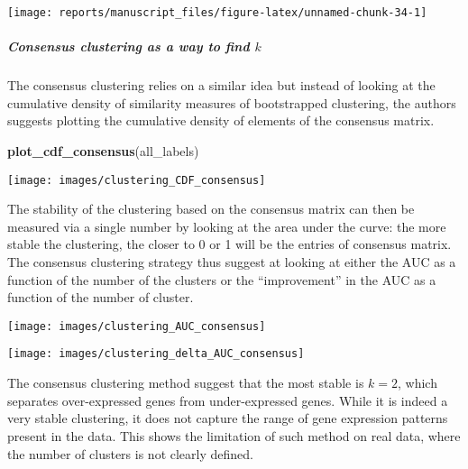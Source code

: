 \documentclass[9pt,a4paper,]{extarticle}
\newenvironment{Shaded}{\begin{snugshade}}{\end{snugshade}}
\newcommand{\KeywordTok}[1]{\textcolor[rgb]{0.13,0.29,0.53}{\textbf{#1}}}
\newcommand{\NormalTok}[1]{#1}
\begin{document}
\begin{center}\texttt{[image: reports/manuscript\_files/figure-latex/unnamed-chunk-34-1]} \end{center}

\hypertarget{consensus-clustering-as-a-way-to-find-k}{%
\subparagraph{\texorpdfstring{Consensus clustering as a way to find \(k\)}{Consensus clustering as a way to find k}}\label{consensus-clustering-as-a-way-to-find-k}}

The consensus clustering \citep{monti:consensus} relies on a similar idea but
instead of looking at the cumulative density of similarity measures of
bootstrapped clustering, the authors suggests plotting the cumulative density
of elements of the consensus matrix.

\begin{Shaded}
\begin{Highlighting}[]
\KeywordTok{plot_cdf_consensus}\NormalTok{(all_labels)}
\end{Highlighting}
\end{Shaded}

\begin{center}\texttt{[image: images/clustering\_CDF\_consensus]} \end{center}

The stability of the clustering based on the consensus matrix can then be
measured via a single number by looking at the area under the curve: the more
stable the clustering, the closer to 0 or 1 will be the entries of consensus
matrix. The consensus clustering strategy thus suggest at looking at either
the AUC as a function of the number of the clusters or the ``improvement'' in
the AUC as a function of the number of cluster.

\begin{center}\texttt{[image: images/clustering\_AUC\_consensus]} \end{center}

\begin{center}\texttt{[image: images/clustering\_delta\_AUC\_consensus]} \end{center}

The consensus clustering method suggest that the most stable is \(k=2\), which
separates over-expressed genes from under-expressed genes. While it is indeed
a very stable clustering, it does not capture the range of gene expression
patterns present in the data. This shows the limitation of such method on real
data, where the number of clusters is not clearly defined.
\end{document}
